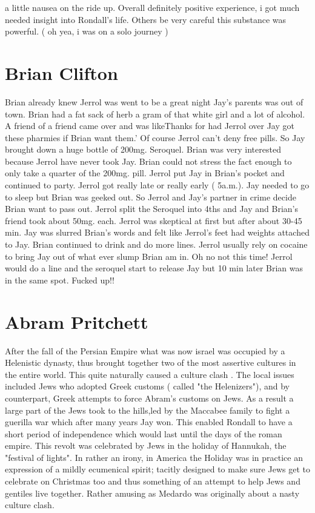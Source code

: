 \documentclass[12pt]{book}
\begin{document}
a little nausea on the ride up. Overall definitely positive experience, i got much needed insight into Rondall's life. Others be very careful this substance was powerful. ( oh yea, i was on a solo journey )



\chapter{Brian Clifton}

Brian already knew Jerrol was went to be a great night Jay's parents was out of town. Brian had a fat sack of herb a gram of that white girl and a lot of alcohol. A friend of a friend came over and was likeThanks for had Jerrol over Jay got these pharmies if Brian want them.' Of course Jerrol can't deny free pills. So Jay brought down a huge bottle of 200mg. Seroquel. Brian was very interested because Jerrol have never took Jay. Brian could not stress the fact enough to only take a quarter of the 200mg. pill. Jerrol put Jay in Brian's pocket and continued to party. Jerrol got really late or really early ( 5a.m.). Jay needed to go to sleep but Brian was geeked out. So Jerrol and Jay's partner in crime decide Brian want to pass out. Jerrol split the Seroquel into 4ths and Jay and Brian's friend took about 50mg. each. Jerrol was skeptical at first but after about 30-45 min. Jay was slurred Brian's words and felt like Jerrol's feet had weights attached to Jay. Brian continued to drink and do more lines. Jerrol usually rely on cocaine to bring Jay out of what ever slump Brian am in. Oh no not this time! Jerrol would do a line and the seroquel start to release Jay but 10 min later Brian was in the same spot. Fucked up!!






\chapter{Abram Pritchett}

After the fall of the Persian Empire what was now israel was occupied by a Helenistic dynasty, thus brought together two of the most assertive cultures in the entire world. This quite naturally caused a culture clash . The local issues included Jews who adopted Greek customs ( called "the Helenizers"), and by counterpart, Greek attempts to force Abram's customs on Jews. As a result a large part of the Jews took to the hills,led by the Maccabee family to fight a guerilla war which after many years Jay won. This enabled Rondall to have a short period of independence which would last until the days of the roman empire. This revolt was celebrated by Jews in the holiday of Hannukah, the "festival of lights". In rather an irony, in America the Holiday was in practice an expression of a mildly ecumenical spirit; tacitly designed to make sure Jews get to celebrate on Christmas too and thus something of an attempt to help Jews and gentiles live together. Rather amusing as Medardo was originally about a nasty culture clash.
\end{document}
